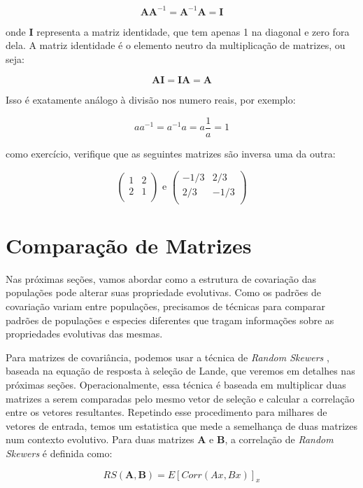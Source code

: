 \documentclass[portuges,]{tufte-handout}
\begin{document}
\[
\mathbf{A}\mathbf{A}^{-1} = \mathbf{A}^{-1}\mathbf{A} = \mathbf{I}
\]

onde \(\mathbf{I}\) representa a matriz identidade, que tem apenas 1 na
diagonal e zero fora dela. A matriz identidade é o elemento neutro da
multiplicação de matrizes, ou seja:

\[
\mathbf{A}\mathbf{I} = \mathbf{I}\mathbf{A} = \mathbf{A}
\]

Isso é exatamente análogo à divisão nos numero reais, por exemplo:

\[
aa^{-1} = a^{-1}a = a\frac{1}{a} = 1
\]

como exercício, verifique que as seguintes matrizes são inversa uma da
outra:

\[
\left (
\begin{matrix}
1 & 2 \\
2 & 1 \\
\end{matrix}
\right )
\text{ e }
\left (
\begin{matrix}
-1/3 & 2/3 \\
2/3 & -1/3 \\
\end{matrix}
\right )
\]

\section{Comparação de Matrizes}\label{comparauxe7uxe3o-de-matrizes}

Nas próximas seções, vamos abordar como a estrutura de covariação das
populações pode alterar suas propriedade evolutivas. Como os padrões de
covariação variam entre populações, precisamos de técnicas para comparar
padrões de populações e especies diferentes que tragam informações sobre
as propriedades evolutivas das mesmas.

Para matrizes de covariância, podemos usar a técnica de \emph{Random
Skewers} \cite{Cheverud2007}, baseada na equação de resposta à
seleção de Lande, que veremos em detalhes nas próximas seções.
Operacionalmente, essa técnica é baseada em multiplicar duas matrizes a
serem comparadas pelo mesmo vetor de seleção e calcular a correlação
entre os vetores resultantes. Repetindo esse procedimento para milhares
de vetores de entrada, temos um estatistica que mede a semelhança de
duas matrizes num contexto evolutivo. Para duas matrizes \(\mathbf{A}\)
e \(\mathbf{B}\), a correlação de \emph{Random Skewers} é definida como:

\[
RS(\mathbf{A}, \mathbf{B}) = E[Corr(Ax, Bx)]_x
\]
\end{document}
